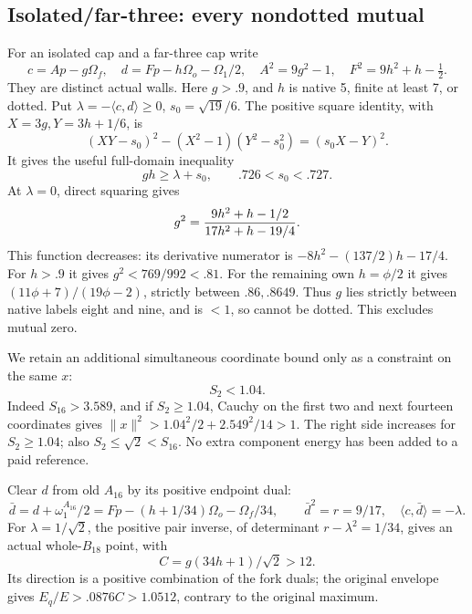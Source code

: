\documentclass[11pt]{article}
\theoremstyle{definition}
\theoremstyle{remark}
\newcommand{\ip}[2]{\langle #1,#2\rangle}
\newcommand{\norm}[1]{\lVert #1\rVert}
\begin{document}
\subsection{Isolated/far-three: every nondotted mutual}
\label{app:D18isolatedfarfinite}

For an isolated cap and a far-three cap write
\[
 c=Ap-g\Omega_f,\quad
 d=Fp-h\Omega_o-\Omega_1/2,\quad
 A^2=9g^2-1,\quad F^2=9h^2+h-\tfrac12 .
\]
They are distinct actual walls.  Here \(g>.9\), and \(h\) is
native 5, finite at least 7, or dotted.
Put \(\lambda=-\ip cd\ge0\), \(s_0=\sqrt{19}/6\).
The positive square identity, with
\(X=3g,Y=3h+1/6\), is
\[
 (XY-s_0)^2-(X^2-1)(Y^2-s_0^2)=(s_0X-Y)^2 .
\]
It gives the useful full-domain inequality
\[
                       gh\ge\lambda+s_0,\qquad
                       .726<s_0<.727.
\tag{DIFproduct}\label{eq:DIFproduct}
\]
At \(\lambda=0\), direct squaring gives
\[
 g^2={9h^2+h-1/2\over17h^2+h-19/4}.
\]
This function decreases: its derivative numerator is
\(-8h^2-(137/2)h-17/4\).
For \(h>.9\) it gives \(g^2<769/992<.81\).
For the remaining own \(h=\phi/2\) it gives
\((11\phi+7)/(19\phi-2)\), strictly between \(.86,.8649\).
Thus \(g\) lies strictly between native labels eight and nine,
and is \(<1\), so cannot be dotted.  This excludes mutual zero.

We retain an additional simultaneous coordinate bound only as a
constraint on the same \(x\):
\[
                            S_2<1.04 .
\tag{DIFS2}\label{eq:DIFS2}
\]
Indeed \(S_{16}>3.589\), and if \(S_2\ge1.04\), Cauchy on
the first two and next fourteen coordinates gives
\(\norm x^2>1.04^2/2+2.549^2/14>1\).
The right side increases for \(S_2\ge1.04\);
also \(S_2\le\sqrt2<S_{16}\).
No extra component energy has been added to a paid reference.

Clear \(d\) from old \(A_{16}\) by its positive endpoint dual:
\[
 \bar d=d+\omega_1^{A_{16}}/2
       =Fp-(h+1/34)\Omega_o-\Omega_f/34,\qquad
 \bar d^2=r=9/17,\quad \ip c{\bar d}=-\lambda.
\]
For \(\lambda=1/\sqrt2\), the positive pair inverse, of determinant
\(r-\lambda^2=1/34\), gives an actual whole-\(B_{18}\) point,
with
\[
                          C=g(34h+1)/\sqrt2>12 .
\]
Its direction is a positive combination of the fork duals;
the original envelope gives \(E_q/E>.0876C>1.0512\),
contrary to the original maximum.
\end{document}
